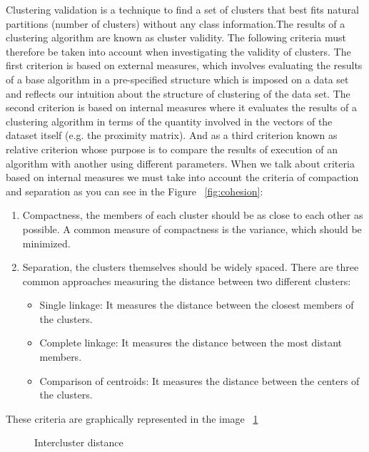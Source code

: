 Clustering validation is a technique to find a set of clusters that best fits natural partitions (number of clusters) without any class information.The results of a clustering algorithm are known as cluster validity. The following criteria must therefore be taken into account when investigating the validity of clusters. The first criterion is based on external measures, which involves evaluating the results of a base algorithm in a pre-specified structure which is imposed on a data set and reflects our intuition about the structure of clustering of the data set. The second criterion is based on internal measures where it evaluates the results of a clustering algorithm in terms of the quantity involved in the vectors of the dataset itself (e.g. the proximity matrix). And as a third criterion known as relative criterion whose purpose is to compare the results of execution of an algorithm with another using different parameters.
When we talk about criteria based on internal measures we must take into account the criteria of compaction and separation \citep{b53} \citep{b52} as you can see in the Figure ~\ref{fig:cohesion}:
\begin{enumerate}
  \item Compactness, the members of each cluster should be as close to each other as possible. A common measure of compactness is the variance, which should be minimized.
  \item Separation, the clusters themselves should be widely spaced. There are three common approaches measuring the distance between two different clusters:
  \begin{itemize}
  \item Single linkage: It measures the distance between the closest members of the clusters.
  \item Complete linkage: It measures the distance between the most distant members.
  \item Comparison of centroids: It measures the distance between the centers of the clusters.
\end{itemize}
\end{enumerate}
These criteria are graphically represented in the image ~\ref{fig:separation}

\begin{figure}[htbp]
  \centering
    \caption{Intercluster distance \citep{b60}}%
    \label{fig:separation}%
\end{figure}

